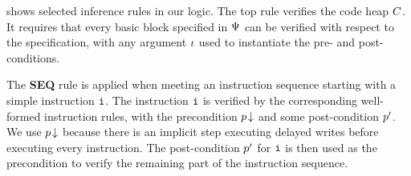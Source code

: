 \Fig{\ref{fig:Seleted Inference rules}} shows
selected inference rules in our logic.
The top rule \cdhp{} verifies the code
heap $C$. It requires that every basic block
specified in $\Psi$ can be verified with
respect to the specification, with any
argument $\iota$ used to instantiate the
pre- and post-conditions.


The \textbf{SEQ} rule is applied
when meeting an instruction sequence
starting with a simple instruction $\texttt{i}$.
The instruction $\texttt{i}$ is verified by the
corresponding well-formed instruction rules,
with the precondition ${p}\!\downarrow$ and some
post-condition $p'$. We use ${p}\!\downarrow$
because there is an implicit step executing delayed
writes before executing every instruction.
The post-condition $p'$ for $\texttt{i}$ is then
used as the precondition to verify
the remaining part of the instruction sequence.
%


